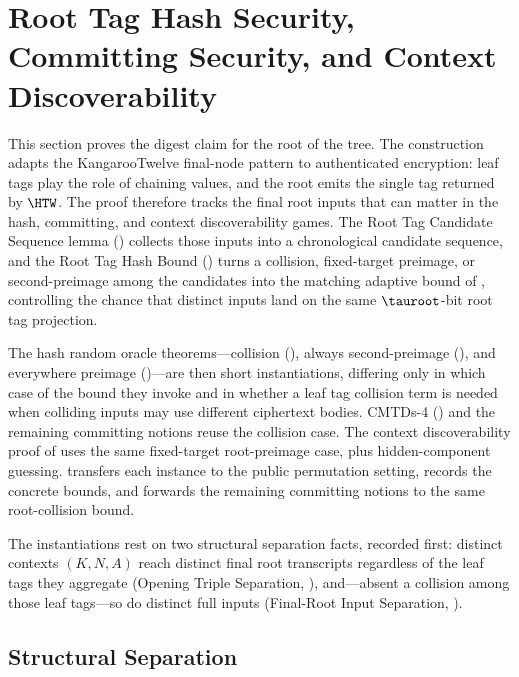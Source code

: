 \section{Root Tag Hash Security, Committing Security, and Context Discoverability}
\label{sec:cmtds3}
\label{sec:root-tag-hash-security}

This section proves the digest claim for the root of the \TW{} tree. The
construction adapts the KangarooTwelve final-node pattern to authenticated
encryption: leaf tags play the role of chaining values, and the root emits the
single tag returned by $\HTW$. The proof therefore tracks the final root inputs
that can matter in the hash, committing, and context discoverability games. The
Root Tag Candidate Sequence lemma () collects those inputs
into a chronological candidate sequence, and the Root Tag Hash Bound
() turns a collision, fixed-target preimage, or
second-preimage among the candidates into the matching adaptive bound of
, controlling the chance that distinct inputs land on the same
$\tauroot$-bit root tag projection.

The hash random oracle theorems---collision (), always
second-preimage (), and everywhere preimage
()---are then short instantiations, differing only in which
case of the bound they invoke and in whether a leaf tag collision term is needed
when colliding inputs may use different ciphertext bodies. CMTDs-4
() and the remaining committing notions reuse the collision
case. The context discoverability proof of  uses the same
fixed-target root-preimage case, plus hidden-component guessing.
 transfers each instance to the public
permutation setting,  records the concrete bounds,
and  forwards the remaining \cite{BH22}
committing notions to the same root-collision bound.

The instantiations rest on two structural separation facts, recorded
first: distinct contexts $(K, N, A)$ reach distinct final root
transcripts regardless of the leaf tags they aggregate (Opening Triple
Separation, ), and---absent a collision among those
leaf tags---so do distinct full inputs (Final-Root Input Separation,
).

\subsection{Structural Separation}

